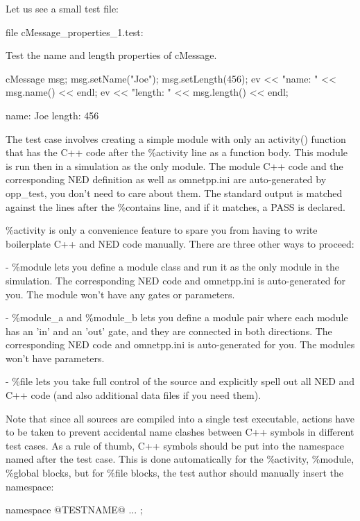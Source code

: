 Let us see a small test file:

file cMessage\_properties\_1.test:

\begin{filelisting}
  Test the name and length properties of cMessage.

  cMessage msg;
  msg.setName("Joe");
  msg.setLength(456);
  ev << "name: " << msg.name() << endl;
  ev << "length: " << msg.length() << endl;

  name: Joe
  length: 456
\end{filelisting}

The test case involves creating a simple module with only an activity()
function that has the C++ code after the \%activity line as a function body.
This module is run then in a simulation as the only module. The module C++
code and the corresponding NED definition as well as omnetpp.ini are
auto-generated by opp\_test, you don't need to care about them.
The standard output is matched against the lines after the \%contains
line, and if it matches, a PASS is declared.

\%activity is only a convenience feature to spare you from having to write
boilerplate C++ and NED code manually. There are three other ways to proceed:

- \%module lets you define a module class and run it as the only module
  in the simulation. The corresponding NED code and omnetpp.ini is
  auto-generated for you. The module won't have any gates or parameters.

- \%module\_a and \%module\_b lets you define a module pair where each module
  has an 'in' and an 'out' gate, and they are connected in both directions.
  The corresponding NED code and omnetpp.ini is auto-generated for you.
  The modules won't have parameters.

- \%file lets you take full control of the source and explicitly spell out
  all NED and C++ code (and also additional data files if you need them).

Note that since all sources are compiled into a single test executable,
actions have to be taken to prevent accidental name clashes between C++
symbols in different test cases. As a rule of thumb, C++ symbols should
be put into the namespace named after the test case. This is done
automatically for the \%activity, \%module, \%global blocks, but for \%file
blocks, the test author should manually insert the namespace:

\begin{filelisting}
namespace @TESTNAME@ {
   ...
};
\end{filelisting}

